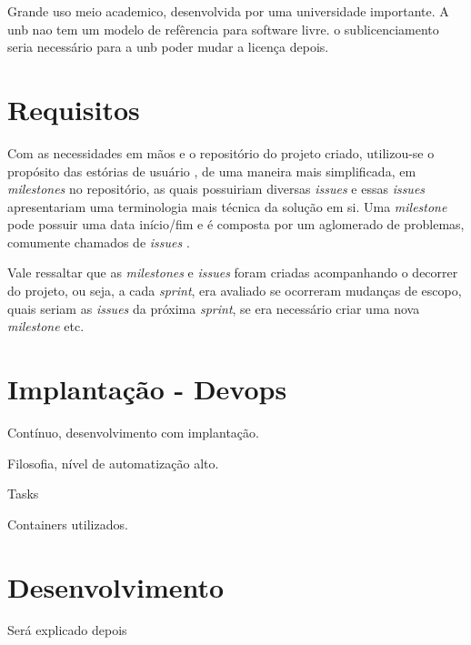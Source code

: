 Grande uso meio academico, desenvolvida por uma universidade importante. A unb nao tem um modelo de refêrencia para software livre. o sublicenciamento seria necessário para a unb poder mudar a licença depois.

\section{Requisitos}
Com as necessidades em mãos e o repositório do projeto criado, utilizou-se o propósito das estórias de usuário \cite{beck_2004}, de uma maneira mais simplificada, em \textit{milestones} no repositório, as quais possuiriam diversas \textit{issues} e essas \textit{issues} apresentariam uma terminologia mais técnica da solução em si. Uma \textit{milestone} pode possuir uma data início/fim e é composta por um aglomerado de problemas, comumente chamados de \textit{issues} \cite{gitlab}.

Vale ressaltar que as \textit{milestones} e \textit{issues} foram criadas acompanhando o decorrer do projeto, ou seja, a cada \textit{sprint}, era avaliado se ocorreram mudanças de escopo, quais seriam as \textit{issues} da próxima \textit{sprint}, se era necessário criar uma nova \textit{milestone} etc.

\section{Implantação - Devops}
Contínuo, desenvolvimento com implantação.

Filosofia, nível de automatização alto.

Tasks

Containers utilizados.

\section{Desenvolvimento}
Será explicado depois